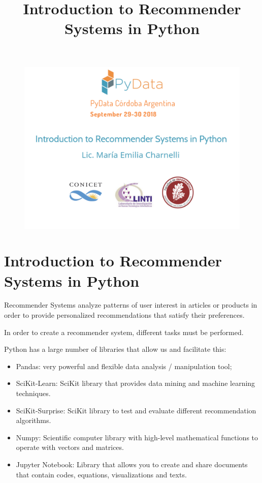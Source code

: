 \documentclass[11pt]{article}
\title{Introduction to Recommender Systems in Python}
\makeatletter
\def\maxwidth{\ifdim\Gin@nat@width>\linewidth\linewidth
    \else\Gin@nat@width\fi}
\let\Oldincludegraphics\includegraphics
\renewcommand{\includegraphics}[1]{\Oldincludegraphics[width=.8\maxwidth]{#1}}
\providecommand{\tightlist}{%
      \setlength{\itemsep}{0pt}\setlength{\parskip}{0pt}}
\makeatother
\begin{document}
    
    
    \maketitle
    
    

    
    \begin{figure}[htbp]
\centering
\includegraphics{portada-pydata.png}
\caption{}
\end{figure}

    \section{Introduction to Recommender Systems in
Python}\label{introduction-to-recommender-systems-in-python}

    Recommender Systems analyze patterns of user interest in articles or
products in order to provide personalized recommendations that satisfy
their preferences.

In order to create a recommender system, different tasks must be
performed.

Python has a large number of libraries that allow us and facilitate
this:

\begin{itemize}
\tightlist
\item
  Pandas: very powerful and flexible data analysis / manipulation tool;
\item
  SciKit-Learn: SciKit library that provides data mining and machine
  learning techniques.
\item
  SciKit-Surprise: SciKit library to test and evaluate different
  recommendation algorithms.
\item
  Numpy: Scientific computer library with high-level mathematical
  functions to operate with vectors and matrices.
\item
  Jupyter Notebook: Library that allows you to create and share
  documents that contain codes, equations, visualizations and texts.
\end{itemize}
\end{document}
